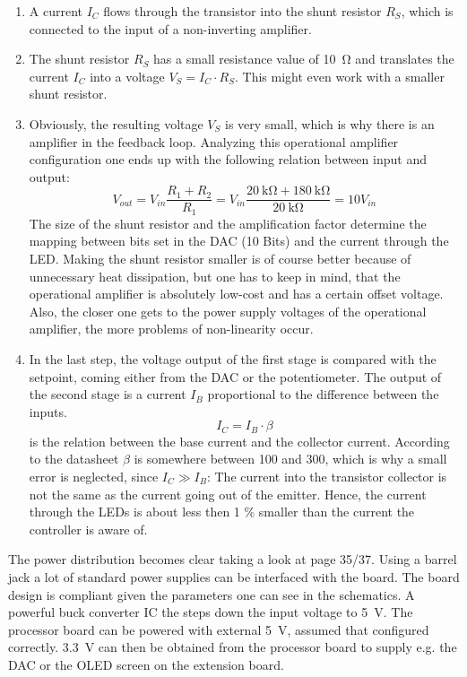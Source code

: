 \begin{enumerate}
\item A current \ensuremath{I_C} flows through the transistor into the shunt resistor \ensuremath{R_S}, which is connected to the input of a non-inverting amplifier. 
\item The shunt resistor \ensuremath{R_S} has a small resistance value of \SI{10}{\ohm} and translates the current \ensuremath{I_C} into a voltage \ensuremath{V_S = I_C \cdot R_S}. This might even work with a smaller shunt resistor. 
\item Obviously, the resulting voltage \ensuremath{V_S} is very small, which is why there is an amplifier in the feedback loop. Analyzing this operational amplifier configuration one ends up with the following relation between input and output: 
\begin{equation}
V_{out} = V_{in} \frac{R_1 + R_2}{R_1} = V_{in} \frac{\SI{20}{\kilo\ohm} + \SI{180}{\kilo\ohm}}{\SI{20}{\kilo\ohm}} = 10 V_{in}
\end{equation}
The size of the shunt resistor and the amplification factor determine the mapping between bits set in the \gls{DAC} (10 Bits) and the current through the \gls{LED}. Making the shunt resistor smaller is of course better because of unnecessary heat dissipation, but one has to keep in mind, that the operational amplifier is absolutely low-cost and has a certain offset voltage. Also, the closer one gets to the power supply voltages of the operational amplifier, the more problems of non-linearity occur. 
\item In the last step, the voltage output of the first stage is compared with the setpoint, coming either from the \gls{DAC} or the potentiometer. The output of the second stage is a current \ensuremath{I_B} proportional to the difference between the inputs. 
\begin{equation}
 I_C = I_B \cdot \beta
\end{equation}
is the relation between the base current and the collector current. According to the datasheet \ensuremath{\beta} is somewhere between 100 and 300, which is why a small error is neglected, since \ensuremath{I_C \gg I_B}: The current into the transistor collector is not the same as the current going out of the emitter. Hence, the current through the \glspl{LED} is about less then 1 \% smaller than the current the controller is aware of. 
\end{enumerate} 
The power distribution becomes clear taking a look at page 35/37. Using a barrel jack a lot of standard power supplies can be interfaced with the board. The board design is  compliant given the parameters one can see in the schematics. A powerful buck converter \gls{IC} the  steps down the input voltage to \SI{5}{\volt}. The processor board can be powered with external \SI{5}{\volt}, assumed that configured correctly. \SI{3.3}{\volt} can then be obtained from the processor board to supply e.g. the \gls{DAC} or the \gls{OLED} screen on the extension board. 
